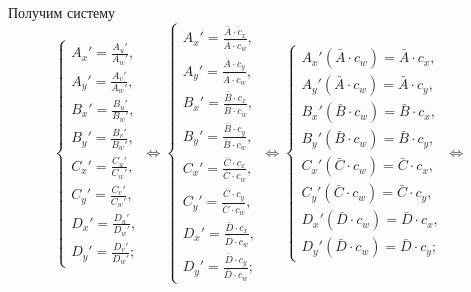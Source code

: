 Получим систему
\begin{equation*}
	\begin{cases}
		A_x' = \frac{A_u'}{A_w'},\\
		A_y' = \frac{A_v'}{A_w'},\\
		B_x' = \frac{B_u'}{B_w'},\\
		B_y' = \frac{B_v'}{B_w'},\\
		C_x' = \frac{C_u'}{C_w'},\\
		C_y' = \frac{C_v'}{C_w'},\\
		D_x' = \frac{D_u'}{D_w'},\\
		D_y' = \frac{D_v'}{D_w'};
	\end{cases}
	\Leftrightarrow
	\begin{cases}
		A_x' = \frac{\bar A\cdot c_x}{\bar A \cdot c_w},\\
		A_y' = \frac{\bar A\cdot c_y}{\bar A \cdot c_w},\\
		B_x' = \frac{\bar B\cdot c_x}{\bar B \cdot c_w},\\
		B_y' = \frac{\bar B\cdot c_y}{\bar B \cdot c_w},\\
		C_x' = \frac{\bar C\cdot c_x}{\bar C \cdot c_w},\\
		C_y' = \frac{\bar C\cdot c_y}{\bar C \cdot c_w},\\
		D_x' = \frac{\bar D\cdot c_x}{\bar D \cdot c_w},\\
		D_y' = \frac{\bar D\cdot c_y}{\bar D \cdot c_w};
	\end{cases}
	\Leftrightarrow
	\begin{cases}
		A_x'\left( \bar A \cdot c_w \right) = \bar A\cdot c_x,\\
		A_y'\left( \bar A \cdot c_w \right) = \bar A\cdot c_y,\\
		B_x'\left( \bar B \cdot c_w \right) = \bar B\cdot c_x,\\
		B_y'\left( \bar B \cdot c_w \right) = \bar B\cdot c_y,\\
		C_x'\left( \bar C \cdot c_w \right) = \bar C\cdot c_x,\\
		C_y'\left( \bar C \cdot c_w \right) = \bar C\cdot c_y,\\
		D_x'\left( \bar D \cdot c_w \right) = \bar D\cdot c_x,\\
		D_y'\left( \bar D \cdot c_w \right) = \bar D\cdot c_y;
	\end{cases}	
	\Leftrightarrow
\end{equation*}
